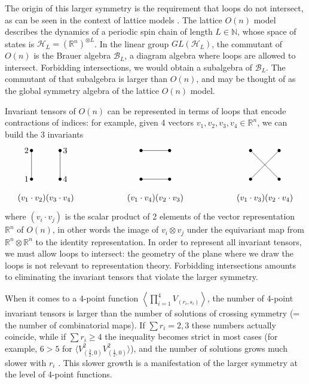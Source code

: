 \documentclass[12pt, a4paper]{article}
\newcommand{\vertices}{
\coordinate (base) at (0, 1);
\draw (0, 0) node[fill, circle, minimum size = 1.3mm, inner sep = 0]{};
  \draw (3, 0) node[fill, circle, minimum size = 1.3mm, inner sep = 0]{};
  \draw (0, 3) node[fill, circle, minimum size = 1.3mm, inner sep = 0]{};
  \draw (3, 3) node[fill, circle, minimum size = 1.3mm, inner sep = 0]{};
}
\begin{document}
The origin of this larger symmetry is the requirement that loops do not intersect, as can be seen in the context of lattice models \cite{jrs22}. The lattice $O(n)$ model describes the dynamics of a periodic spin chain of length $L\in\mathbb{N}$, whose space of states is $\mathcal{H}_L=\left(\mathbb{R}^n\right)^{\otimes L}$. In the linear group $GL(\mathcal{H}_L)$, the commutant of $O(n)$ is the Brauer algebra $\mathcal{B}_L$, a diagram algebra where loops are allowed to intersect. Forbidding intersections, we would obtain a subalgebra of $\mathcal{B}_L$. The commutant of that subalgebra is larger than $O(n)$, and may be thought of as the global symmetry algebra of the lattice $O(n)$ model.

Invariant tensors of $O(n)$ can be represented in terms of loops that encode contractions of indices: for example, given 4 vectors $v_1,v_2,v_3,v_4\in \mathbb{R}^n$, we can build the 3 invariants 
\begin{align}
\begin{tikzpicture}[baseline=(base), scale = .4]
  \vertices
  \draw (0, 0) node [left]{$1$} -- (0, 3) node[left]{$2$};
  \draw (3, 0) node [right]{$4$} -- (3, 3) node[right]{$3$};
  \node at (1.5, -2) {$(v_1\cdot v_2)(v_3\cdot v_4)$};
 \end{tikzpicture}
 \hspace{2cm}
 \begin{tikzpicture}[baseline=(base), scale = .4]
  \vertices
 \draw (0, 3) -- (3, 3) ;
 \draw (0,0) -- (3,0);
 \node at (1.5, -2) {$(v_1\cdot v_4)(v_2\cdot v_3)$};
 \end{tikzpicture}
 \hspace{2cm}
 \begin{tikzpicture}[baseline=(base), scale = .4]
  \vertices
 \draw (0, 3) -- (3, 0) ;
  \draw (3, 3) -- (0, 0);
  \node at (1.5, -2) {$(v_1\cdot v_3)(v_2\cdot v_4)$};
 \end{tikzpicture}
\end{align}
where $(v_i\cdot v_j)$ is the scalar product of 2 elements of the vector representation $\mathbb{R}^n$ of $O(n)$, in other words the image of $v_i\otimes v_j$ under the equivariant map from $\mathbb{R}^n\otimes \mathbb{R}^n$ to the identity representation. In order to represent all invariant tensors, we must allow loops to intersect: the geometry of the plane where we draw the loops is not relevant to representation theory. Forbidding intersections amounts to eliminating the invariant tensors that violate the larger symmetry. 

When it comes to a 4-point function $\left<\prod_{i=1}^4 V_{(r_i,s_i)}\right>$, the number of 4-point invariant tensors is larger than the number of solutions of crossing symmetry (= the number of combinatorial maps). If $\sum r_i = 2, 3$ these numbers actually coincide, while if $\sum r_i\geq 4$ the inequality becomes strict in most cases (for example, $6>5$ for $\big\langle V_{(\frac32,0)}^2V_{(\frac12,0)}^2\big\rangle$), and the number of solutions grows much slower with $r_i$ \cite{gjnrs23}. This slower growth is a manifestation of the larger symmetry at the level of 4-point functions. 
\end{document}
